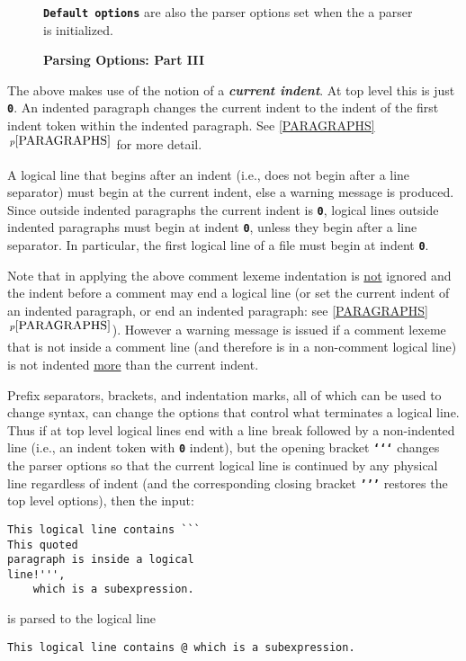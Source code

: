 \documentclass[12pt]{article}
\newcommand{\TT}[1]{{\tt \bfseries #1}}
\newcommand{\key}[1]{{\bf \em #1}\index{#1}}
\newcommand{\itemref}[1]{\ref{#1}$\,^{p\pageref{#1}}$}
\newlength{\figurewidth}
\newenvironment{boxedfigure}[1][!btp]%
	{\begin{figure*}[#1]
	 \begin{lrbox}{\figurebox}
	 \begin{minipage}{\figurewidth}

	 \vspace*{1ex}}%
	{
	 \vspace*{1ex}

	 \end{minipage}
	 \end{lrbox}

	 \centering
	 \fbox{\hspace*{0.1in}\usebox{\figurebox}\hspace*{0.1in}}
	 \end{figure*}}
\newenvironment{indpar}[1][0.3in]%
	{\begin{list}{}%
		     {\setlength{\itemsep}{0in}%
		      \setlength{\topsep}{0in}%
		      \setlength{\parsep}{1ex}%
		      \setlength{\labelwidth}{#1}%
		      \setlength{\leftmargin}{#1}%
		      \addtolength{\leftmargin}{\labelsep}}%
	 \item}%
	{\end{list}}
\begin{document}
\begin{boxedfigure}[!t]
\TT{Default options}\label{DEFAULT-OPTIONS}
are also the parser options set when the
a parser is initialized.

\medskip

\caption{\bf Parsing Options: Part III}
\label{OPTION-NAMES-3}

\end{boxedfigure}

The above makes use of the notion of a \key{current indent}.  At top
level this is just \TT{0}.  An indented paragraph changes the current
indent to the indent of the first indent token within the indented
paragraph.  See \itemref{PARAGRAPHS} for more detail.

A logical line that begins after an indent (i.e., does not begin
after a line separator) must begin at the current indent,
else a warning message is produced.
Since outside indented paragraphs the current indent is \TT{0},
logical lines outside indented paragraphs must begin at indent \TT{0},
unless they begin after a line separator.  In particular, the first
logical line of a file must begin at indent \TT{0}.

Note that in applying the above comment lexeme indentation
is \underline{not} ignored
and the indent before a comment may end a logical line (or set the
current indent of an indented paragraph, or end an indented paragraph:
see \itemref{PARAGRAPHS}).
However a warning message is issued if a comment lexeme that is not
inside a comment line (and therefore is in a non-comment logical line)
is not indented \underline{more} than the current indent.

Prefix separators, brackets, and indentation marks, all of which
can be used to change syntax, can change the options that control
what terminates a logical line.  Thus if at top level logical
lines end with a line break followed by a non-indented line
(i.e., an indent token with \TT{0} indent),
but the opening bracket \TT{`{}`{}`} changes the parser options so that
the current logical line is continued by any physical line regardless of
indent (and the corresponding closing bracket \TT{'{}'{}'} restores
the top level options), then the input:
\begin{indpar}\begin{verbatim}
This logical line contains ```
This quoted
paragraph is inside a logical
line!''',
    which is a subexpression.
\end{verbatim}\end{indpar}

is parsed to the logical line
\begin{indpar}\begin{verbatim}
This logical line contains @ which is a subexpression.
\end{verbatim}\end{indpar}
\end{document}
